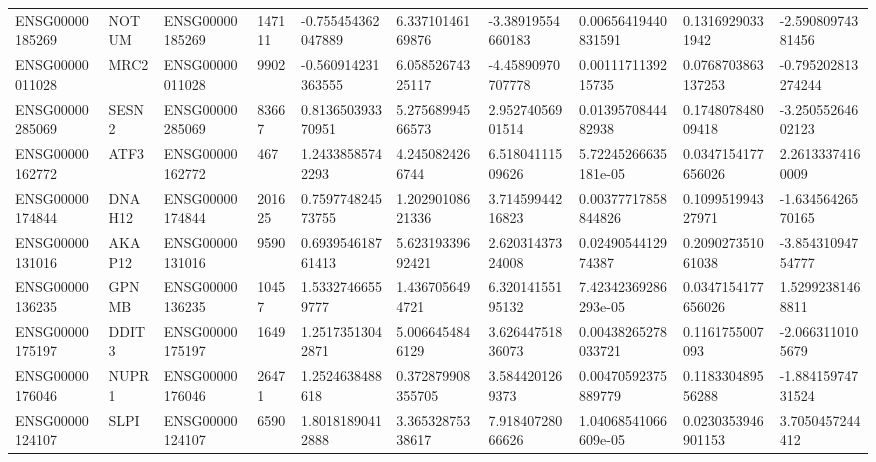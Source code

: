 \begin{tabular}{@{}llllllllll@{}}
ENSG00000185269 & NOTUM & ENSG00000185269 & 147111 & -0.755454362047889 & 6.33710146169876 & -3.38919554660183 & 0.00656419440831591 & 0.13169290331942 & -2.59080974381456 \\
ENSG00000011028 & MRC2 & ENSG00000011028 & 9902 & -0.560914231363555 & 6.05852674325117 & -4.45890970707778 & 0.0011171139215735 & 0.0768703863137253 & -0.795202813274244 \\
ENSG00000285069 & SESN2 & ENSG00000285069 & 83667 & 0.813650393370951 & 5.27568994566573 & 2.95274056901514 & 0.0139570844482938 & 0.174807848009418 & -3.25055264602123 \\
ENSG00000162772 & ATF3 & ENSG00000162772 & 467 & 1.24338585742293 & 4.2450824266744 & 6.51804111509626 & 5.72245266635181e-05 & 0.0347154177656026 & 2.26133374160009 \\
ENSG00000174844 & DNAH12 & ENSG00000174844 & 201625 & 0.759774824573755 & 1.20290108621336 & 3.71459944216823 & 0.00377717858844826 & 0.109951994327971 & -1.63456426570165 \\
ENSG00000131016 & AKAP12 & ENSG00000131016 & 9590 & 0.693954618761413 & 5.62319339692421 & 2.62031437324008 & 0.0249054412974387 & 0.209027351061038 & -3.85431094754777 \\
ENSG00000136235 & GPNMB & ENSG00000136235 & 10457 & 1.53327466559777 & 1.4367056494721 & 6.32014155195132 & 7.42342369286293e-05 & 0.0347154177656026 & 1.52992381468811 \\
ENSG00000175197 & DDIT3 & ENSG00000175197 & 1649 & 1.25173513042871 & 5.0066454846129 & 3.62644751836073 & 0.00438265278033721 & 0.1161755007093 & -2.0663110105679 \\
ENSG00000176046 & NUPR1 & ENSG00000176046 & 26471 & 1.2524638488618 & 0.372879908355705 & 3.5844201269373 & 0.00470592375889779 & 0.118330489556288 & -1.88415974731524 \\
ENSG00000124107 & SLPI & ENSG00000124107 & 6590 & 1.80181890412888 & 3.36532875338617 & 7.91840728066626 & 1.04068541066609e-05 & 0.0230353946901153 & 3.7050457244412 \\
\bottomrule
\end{tabular}
\endgroup
